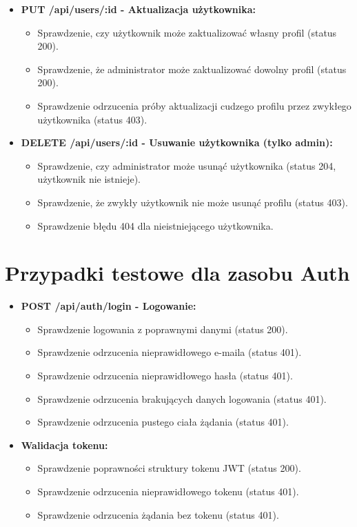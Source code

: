 \documentclass{article}
\begin{document}
\begin{itemize}
    \item \textbf{PUT /api/users/:id - Aktualizacja użytkownika:}
    \begin{itemize}
        \item Sprawdzenie, czy użytkownik może zaktualizować własny profil (status 200).
        \item Sprawdzenie, że administrator może zaktualizować dowolny profil (status 200).
        \item Sprawdzenie odrzucenia próby aktualizacji cudzego profilu przez zwykłego użytkownika (status 403).
    \end{itemize}

    \item \textbf{DELETE /api/users/:id - Usuwanie użytkownika (tylko admin):}
    \begin{itemize}
        \item Sprawdzenie, czy administrator może usunąć użytkownika (status 204, użytkownik nie istnieje).
        \item Sprawdzenie, że zwykły użytkownik nie może usunąć profilu (status 403).
        \item Sprawdzenie błędu 404 dla nieistniejącego użytkownika.
    \end{itemize}
\end{itemize}

\section{Przypadki testowe dla zasobu Auth}

\begin{itemize}
    \item \textbf{POST /api/auth/login - Logowanie:}
    \begin{itemize}
        \item Sprawdzenie logowania z poprawnymi danymi (status 200).
        \item Sprawdzenie odrzucenia nieprawidłowego e-maila (status 401).
        \item Sprawdzenie odrzucenia nieprawidłowego hasła (status 401).
        \item Sprawdzenie odrzucenia brakujących danych logowania (status 401).
        \item Sprawdzenie odrzucenia pustego ciała żądania (status 401).
    \end{itemize}

    \item \textbf{Walidacja tokenu:}
    \begin{itemize}
        \item Sprawdzenie poprawności struktury tokenu JWT (status 200).
        \item Sprawdzenie odrzucenia nieprawidłowego tokenu (status 401).
        \item Sprawdzenie odrzucenia żądania bez tokenu (status 401).
    \end{itemize}
\end{itemize}
\end{document}

